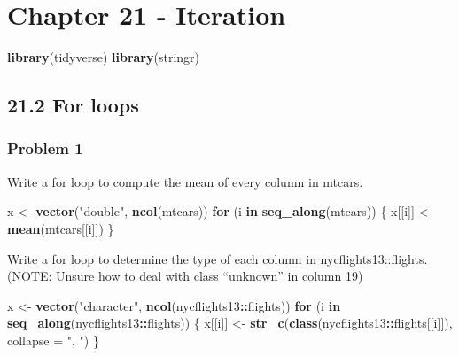 \documentclass[]{article}
\title{}
\author{}
\date{}
\newenvironment{Shaded}{\begin{snugshade}}{\end{snugshade}}
\newcommand{\KeywordTok}[1]{\textcolor[rgb]{0.13,0.29,0.53}{\textbf{#1}}}
\newcommand{\DataTypeTok}[1]{\textcolor[rgb]{0.13,0.29,0.53}{#1}}
\newcommand{\StringTok}[1]{\textcolor[rgb]{0.31,0.60,0.02}{#1}}
\newcommand{\ControlFlowTok}[1]{\textcolor[rgb]{0.13,0.29,0.53}{\textbf{#1}}}
\newcommand{\OperatorTok}[1]{\textcolor[rgb]{0.81,0.36,0.00}{\textbf{#1}}}
\newcommand{\NormalTok}[1]{#1}
\begin{document}
\section*{Chapter 21 - Iteration}\label{chapter-21---iteration}

\begin{Shaded}
\begin{Highlighting}[]
\KeywordTok{library}\NormalTok{(tidyverse)}
\KeywordTok{library}\NormalTok{(stringr)}
\end{Highlighting}
\end{Shaded}

\subsection*{21.2 For loops}\label{for-loops}

\subsubsection*{Problem 1}\label{problem-1}

Write a for loop to compute the mean of every column in mtcars.

\begin{Shaded}
\begin{Highlighting}[]
\NormalTok{x <-}\StringTok{ }\KeywordTok{vector}\NormalTok{(}\StringTok{"double"}\NormalTok{, }\KeywordTok{ncol}\NormalTok{(mtcars))}
\ControlFlowTok{for}\NormalTok{ (i }\ControlFlowTok{in} \KeywordTok{seq_along}\NormalTok{(mtcars)) \{}
\NormalTok{  x[[i]] <-}\StringTok{ }\KeywordTok{mean}\NormalTok{(mtcars[[i]])}
\NormalTok{\}}
\end{Highlighting}
\end{Shaded}

Write a for loop to determine the type of each column in
nycflights13::flights. (NOTE: Unsure how to deal with class ``unknown''
in column 19)

\begin{Shaded}
\begin{Highlighting}[]
\NormalTok{x <-}\StringTok{ }\KeywordTok{vector}\NormalTok{(}\StringTok{"character"}\NormalTok{, }\KeywordTok{ncol}\NormalTok{(nycflights13}\OperatorTok{::}\NormalTok{flights))}
\ControlFlowTok{for}\NormalTok{ (i }\ControlFlowTok{in} \KeywordTok{seq_along}\NormalTok{(nycflights13}\OperatorTok{::}\NormalTok{flights)) \{}
\NormalTok{  x[[i]] <-}\StringTok{ }\KeywordTok{str_c}\NormalTok{(}\KeywordTok{class}\NormalTok{(nycflights13}\OperatorTok{::}\NormalTok{flights[[i]]), }\DataTypeTok{collapse =} \StringTok{", "}\NormalTok{)}
\NormalTok{\}}
\end{Highlighting}
\end{Shaded}
\end{document}
